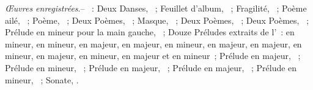 \begin{description}
 \emph{Œuvres enregistrées}.--
 \textsc{\Scriabine{}}~: Deux Danses, ~; Feuillet d'album,
  ~; Fragilité,  ~; Poème ailé,
  ~; Poème,  ~; Deux Poèmes,
 ~; Masque,  ~; Deux Poèmes, ~; Deux
 Poèmes, ~; Prélude en \kC \Sharp mineur pour la main gauche,
  ~; Douze Préludes extraits de l'~: 
 en \kA mineur,  en \kE mineur,  en \kD majeur,
  en \kE majeur,  en \kB \Flat mineur,  en
 \kA \Flat majeur,  en \kE \Flat majeur,  en \kC
 mineur,  en \kB \Flat majeur,  en \kG mineur,
  en \kF majeur et  en \kD mineur~; Prélude en \kC
 majeur,  ~; Prélude en \kB mineur, 
 ~; Prélude en \kA majeur,  ~; Prélude en \kF
 \Sharp majeur,  ~; Prélude en \kC \Sharp mineur,
  ~; Sonate, .


\end{description}
